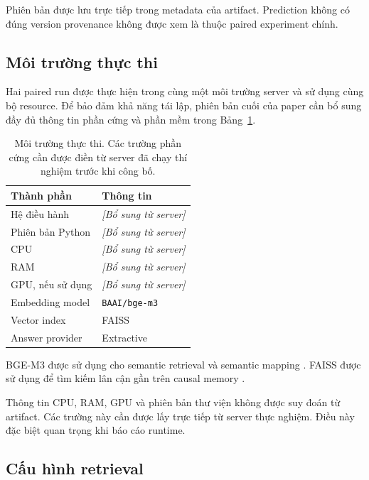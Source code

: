 Phiên bản được lưu trực tiếp trong metadata của artifact. Prediction không
có đúng version provenance không được xem là thuộc paired experiment chính.

\subsection{Môi trường thực thi}

Hai paired run được thực hiện trong cùng một môi trường server và sử dụng
cùng bộ resource. Để bảo đảm khả năng tái lập, phiên bản cuối của paper cần
bổ sung đầy đủ thông tin phần cứng và phần mềm trong
Bảng~\ref{tab:environment}.

\begin{table}[t]
    \centering
    \caption{Môi trường thực thi. Các trường phần cứng cần được điền từ
    server đã chạy thí nghiệm trước khi công bố.}
    \label{tab:environment}
    \begin{tabular}{ll}
        \hline
        \textbf{Thành phần} & \textbf{Thông tin} \\
        \hline
        Hệ điều hành & \textit{[Bổ sung từ server]} \\
        Phiên bản Python & \textit{[Bổ sung từ server]} \\
        CPU & \textit{[Bổ sung từ server]} \\
        RAM & \textit{[Bổ sung từ server]} \\
        GPU, nếu sử dụng & \textit{[Bổ sung từ server]} \\
        Embedding model & \texttt{BAAI/bge-m3} \\
        Vector index & FAISS \\
        Answer provider & Extractive \\
        \hline
    \end{tabular}
\end{table}

BGE-M3 được sử dụng cho semantic retrieval và semantic mapping
\cite{chen2024bgem3}. FAISS được sử dụng để tìm kiếm lân cận gần trên causal
memory \cite{johnson2019billion}.

Thông tin CPU, RAM, GPU và phiên bản thư viện không được suy đoán từ artifact.
Các trường này cần được lấy trực tiếp từ server thực nghiệm. Điều này đặc
biệt quan trọng khi báo cáo runtime.

\subsection{Cấu hình retrieval}

